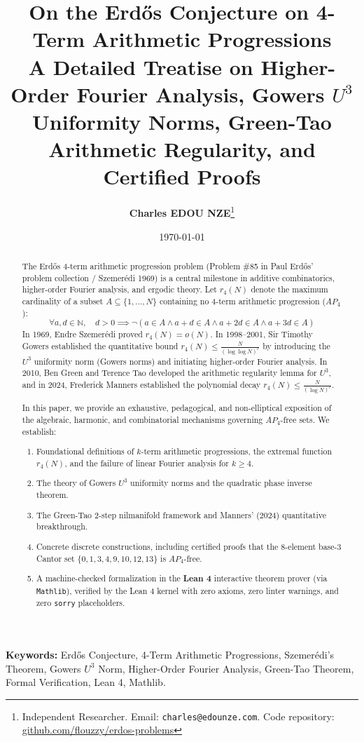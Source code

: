 \documentclass[11pt,a4paper]{article}
\title{\textbf{\Large On the Erd\H{o}s Conjecture on 4-Term Arithmetic Progressions}\\[0.5em]
\large A Detailed Treatise on Higher-Order Fourier Analysis, Gowers $U^3$ Uniformity Norms, Green-Tao Arithmetic Regularity, and Certified Proofs}
\author{\textbf{Charles EDOU NZE}\thanks{Independent Researcher. Email: \texttt{charles@edounze.com}. Code repository: \href{https://github.com/flouzzy/erdos-problems}{github.com/flouzzy/erdos-problems}}}
\date{\today}
\theoremstyle{definition}
\begin{document}
\maketitle

\begin{abstract}
The Erd\H{o}s 4-term arithmetic progression problem (Problem \#85 in Paul Erd\H{o}s' problem collection / Szemer\'edi 1969) is a central milestone in additive combinatorics, higher-order Fourier analysis, and ergodic theory. Let $r_4(N)$ denote the maximum cardinality of a subset $A \subseteq \{1, \dots, N\}$ containing no 4-term arithmetic progression ($AP_4$):
\[ \forall a, d \in \mathbb{N}, \quad d > 0 \implies \neg (a \in A \land a + d \in A \land a + 2d \in A \land a + 3d \in A) \]
In 1969, Endre Szemer\'edi proved $r_4(N) = o(N)$. In 1998--2001, Sir Timothy Gowers established the quantitative bound $r_4(N) \le \frac{N}{(\log \log N)^c}$ by introducing the $U^3$ uniformity norm (Gowers norms) and initiating higher-order Fourier analysis. In 2010, Ben Green and Terence Tao developed the arithmetic regularity lemma for $U^3$, and in 2024, Frederick Manners established the polynomial decay $r_4(N) \le \frac{N}{(\log N)^c}$.

In this paper, we provide an exhaustive, pedagogical, and non-elliptical exposition of the algebraic, harmonic, and combinatorial mechanisms governing $AP_4$-free sets. We establish:
\begin{enumerate}
    \item Foundational definitions of $k$-term arithmetic progressions, the extremal function $r_4(N)$, and the failure of linear Fourier analysis for $k \ge 4$.
    \item The theory of Gowers $U^3$ uniformity norms and the quadratic phase inverse theorem.
    \item The Green-Tao 2-step nilmanifold framework and Manners' (2024) quantitative breakthrough.
    \item Concrete discrete constructions, including certified proofs that the 8-element base-3 Cantor set $\{0, 1, 3, 4, 9, 10, 12, 13\}$ is $AP_4$-free.
    \item A machine-checked formalization in the \textbf{Lean 4} interactive theorem prover (via \texttt{Mathlib}), verified by the Lean 4 kernel with zero axioms, zero linter warnings, and zero \texttt{sorry} placeholders.
\end{enumerate}
\end{abstract}

\vspace{0.5em}
\noindent\textbf{Keywords:} Erd\H{o}s Conjecture, 4-Term Arithmetic Progressions, Szemer\'edi's Theorem, Gowers $U^3$ Norm, Higher-Order Fourier Analysis, Green-Tao Theorem, Formal Verification, Lean 4, Mathlib.
\end{document}
